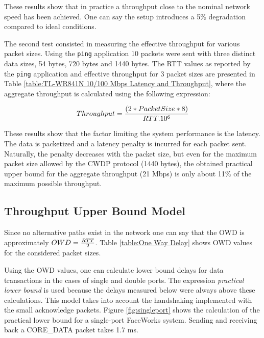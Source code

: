 \documentclass[conference]{IEEEtran}
\begin{document}


These results show that in practice a throughput close to the nominal network speed has been achieved. One can say the setup introduces a 5\% degradation compared to ideal conditions.

The second test consisted in measuring the effective throughput for various packet sizes. Using the {\tt ping} application 10 packets were sent with three distinct data sizes, 54 bytes, 720 bytes and 1440 bytes. The RTT values as reported by the {\tt ping} application and effective throughput for 3 packet sizes are presented in Table \ref{table:TL-WR841N 10/100 Mbps Latency and Throughput}, where the aggregate throughput is calculated using the following expression:

\begin{equation}
Throughput = {(2 * Packet Size * 8) \over {RTT . 10^{6}}}
\end{equation}

These results show that the factor limiting the system performance is the latency. The data is packetized and a latency penalty is incurred for each packet sent. Naturally, the penalty decreases with the packet size,
 but even for the maximum packet size allowed by the CWDP protocol (1440 bytes), the obtained practical upper bound for the aggregate throughput (21 Mbps) is only about 11\% of the maximum possible throughput.



\subsection{Throughput Upper Bound Model}

Since no alternative paths exist in the network one can say that the OWD is approximately $OWD={RTT\over 2}$. Table \ref{table:One Way Delay} shows OWD values for the considered packet sizes.



Using the OWD values, one can calculate lower bound delays for data transactions in the cases of single and double ports. The expression  {\it practical lower bound} is used because the delays measured below were always above these calculations.  This model takes into account the handshaking implemented with the small acknowledge packets. Figure \ref{fig:singleport} shows the calculation of the practical lower bound for a single-port FaceWorks system. Sending and receiving back a CORE\_DATA packet takes 1.7 ms.
\end{document}
